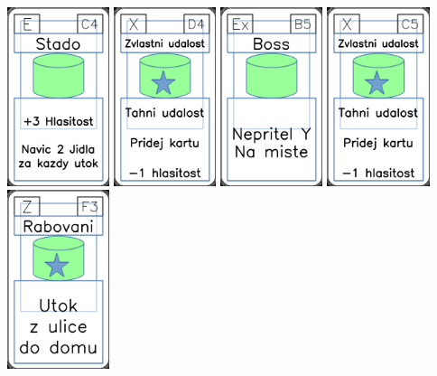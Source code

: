 \documentclass[a4paper]{article}
\begin{document}
	\includegraphics[width=3.0cm]{img-4_43}
	\includegraphics[width=3.0cm]{img-5_18}
	\includegraphics[width=3.0cm]{img-4_9}
	\includegraphics[width=3.0cm]{img-5_14}
	\includegraphics[width=3.0cm]{img-5_57}
\end{document}
